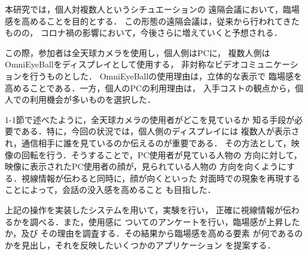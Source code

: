 本研究では，個人対複数人というシチュエーションの
遠隔会議において，臨場感を高めることを目的とする．
この形態の遠隔会議は，従来から行われてきたものの，
コロナ禍の影響において，今後さらに増えていくと予想される．

この際，参加者は全天球カメラを使用し，個人側はPCに，
複数人側はOmniEyeBallをディスプレイとして使用する，
非対称なビデオコミュニケーションを行うものとした．
OmniEyeBallの使用理由は，立体的な表示で
臨場感を高めることである．一方，個人のPCの利用理由は，
入手コストの観点から，個人での利用機会が多いものを選択した．

1-1節で述べたように，全天球カメラの使用者がどこを見ているか
知る手段が必要である．特に，今回の状況では，個人側のディスプレイには
複数人が表示され，通信相手に誰を見ているのか伝えるのが重要である．
その方法として，映像の回転を行う．そうすることで，PC使用者が見ている人物の
方向に対して，映像に表示されたPC使用者の顔が，見られている人物の
方向を向くようにする．視線情報が伝わると同時に，顔が向くといった
対面時での現象を再現することによって，会話の没入感を高めること
も目指した．

上記の操作を実装したシステムを用いて，実験を行い，
正確に視線情報が伝わるかを調べる．また，使用感に
ついてのアンケートを行い，臨場感が上昇したか，及び
その理由を調査する．その結果から臨場感を高める要素
が何であるのかを見出し，それを反映したいくつかのアプリケーション
を提案する．